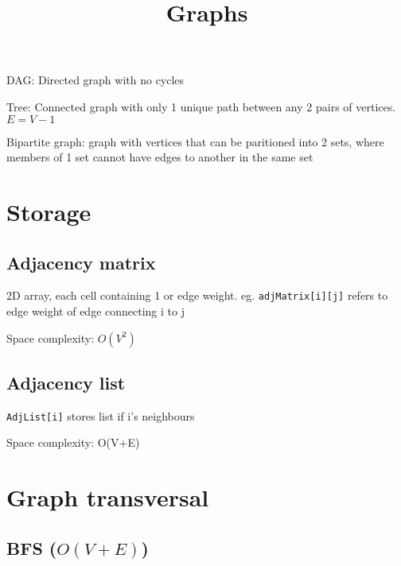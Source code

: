 \documentclass[12pt]{article}
\title{\textbf{Graphs}}
\date{}
\begin{document}
\maketitle

\begin{spacing}{1.5}

\begin{itemize*}
	\item DAG: Directed graph with no cycles
	\item Tree: Connected graph with only 1 unique path between any 2 pairs of vertices. $E=V-1$
	\item Bipartite graph: graph with vertices that can be paritioned into 2 sets, where members of 1 set cannot have edges to another in the same set
\end{itemize*}

\section{Storage}

\subsection{Adjacency matrix}

\begin{itemize*}
	\item 2D array, each cell containing 1 or edge weight. eg. \texttt{adjMatrix[i][j]} refers to edge weight of edge connecting i to j
	\item Space complexity: $O(V^2)$
\end{itemize*}

\subsection{Adjacency list}

\begin{itemize*}
	\item \texttt{AdjList[i]} stores list if i's neighbours
	\item Space complexity: O(V+E)
\end{itemize*}

\section{Graph transversal}

\subsection{BFS ($O(V+E)$)}


\end{spacing}
\end{document}
